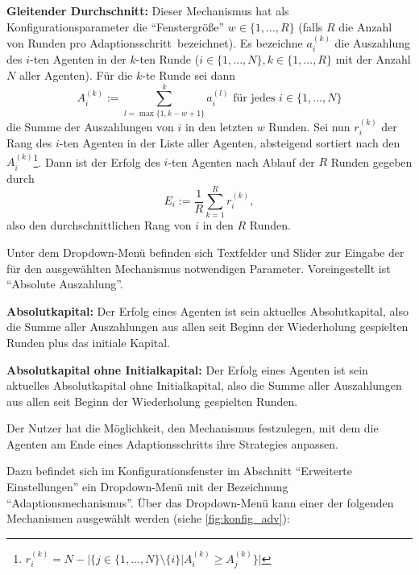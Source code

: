 \documentclass[parskip=full,11pt]{scrartcl}
\def\adapt{Adaptionsschritt}
\begin{document}
\textbf{Gleitender Durchschnitt:}
Dieser Mechanismus hat als Konfigurationsparameter die \enquote{Fenstergröße} \(w \in \{1,...,R\}\) (falls \(R\) die Anzahl von Runden pro \adapt\ bezeichnet). Es bezeichne \(a_i^{(k)}\) die Auszahlung des \(i\)-ten Agenten in der \(k\)-ten Runde (\(i \in \{1,...,N\}, k \in \{1,...,R\}\) mit der Anzahl \(N\) aller Agenten). Für die \(k\)-te Runde sei dann
\[
A_i^{(k)} := \sum_{l = \max\{1,k-w+1\}}^k a_i^{(l)} \text{  für jedes  } i \in \{1,...,N\}
\]
die Summe der Auszahlungen von \(i\) in den letzten \(w\) Runden. Sei nun \(r_i^{(k)}\) der Rang des \(i\)-ten Agenten in der Liste aller Agenten, absteigend sortiert nach den \(A_i^{(k)}\)\footnote{\(r_i^{(k)} = N - |\{j \in \{1,...,N\} \setminus \{i\} | A_i^{(k)} \geq A_j^{(k)}\}|\)}. Dann ist der \Gls{Erfolg} des \(i\)-ten Agenten nach Ablauf der \(R\) Runden gegeben durch
\[
E_i := \frac 1R \sum_{k=1}^R r_i^{(k)},
\]
also den durchschnittlichen Rang von \(i\) in den \(R\) Runden.

Unter dem Dropdown-Menü befinden sich Textfelder und Slider zur Eingabe der für den ausgewählten Mechanismus notwendigen Parameter. Voreingestellt ist \enquote{Absolute Auszahlung}.

\textbf{Absolutkapital:}
Der \Gls{Erfolg} eines Agenten ist sein aktuelles Absolutkapital, also die Summe aller Auszahlungen aus allen seit Beginn der Wiederholung gespielten Runden plus das initiale \Gls{Kapital}.

\textbf{Absolutkapital ohne Initialkapital:}
Der \Gls{Erfolg} eines Agenten ist sein aktuelles Absolutkapital ohne Initialkapital, also die Summe aller Auszahlungen aus allen seit Beginn der Wiederholung gespielten Runden.

Der \Gls{Nutzer} hat die Möglichkeit, den Mechanismus festzulegen, mit dem die Agenten am Ende eines \adapt s ihre \Glspl{Strategie} anpassen.

Dazu befindet sich im Konfigurationsfenster im Abschnitt \enquote{Erweiterte Einstellungen} ein Dropdown-Menü mit der Bezeichnung \enquote{Adaptionsmechanismus}. Über das Dropdown-Menü kann einer der folgenden Mechanismen ausgewählt werden (siehe \cref{fig:konfig_adv}):
\end{document}

